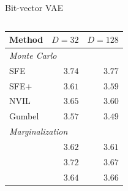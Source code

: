\documentclass[xetex,aspectratio=169,xcolor,professionalfonts,hyperref]{beamer}
\begin{document}
\begin{frame}{Bit-vector VAE}%
    \begin{columns}[T]
        \begin{column}{.53\textwidth}
            \centering\small%
            \begin{tabular}{lrr}
                \toprule
                Method                                    & $D=32$ & $D=128$ \\
                \midrule
                \multicolumn{3}{l}{\emph{Monte Carlo}}                       \\
                SFE                                       & $3.74$ & $3.77$  \\
                SFE$+$                                    & $3.61$ & $3.59$  \\
                NVIL                                      & $3.65$ & $3.60$  \\
                Gumbel                                    & $3.57$ & $3.49$  \\
                \midrule
                \multicolumn{3}{l}{\emph{Marginalization}}                   \\
                \color{tVividBlue}{Top-$k$ sparsemax}     & $3.62$ & $3.61$  \\
                \color{tVividBlue}{SparseMAP}             & $3.72$ & $3.67$  \\
                \color{tVividBlue}{SparseMAP (w/ budget)} & $3.64$ & $3.66$  \\
                \bottomrule
            \end{tabular}
        \end{column}
        \begin{column}{.47\textwidth}
            \centering%
            \only<3>{
                
            }
        \end{column}
    \end{columns}
\end{frame}
\end{document}
